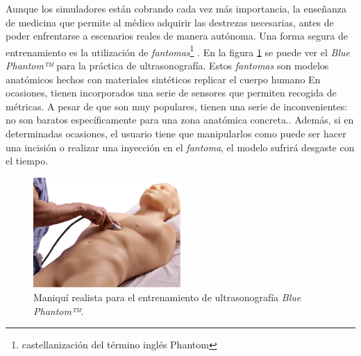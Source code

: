 Aunque los simuladores están cobrando cada vez más importancia, la enseñanza de medicina  que permite al médico adquirir las destrezas necesarias, antes de poder enfrentarse a escenarios reales de manera autónoma. Una forma segura de entrenamiento es la utilización de \emph{fantomas}\footnote{castellanización del término inglés Phantom} \cite{phantomra}. En la figura \ref{fig:phantom} se puede ver el \emph{Blue Phantom™}\cite{BluePH} para la práctica de ultrasonografía. Estos \emph{fantomas} son modelos anatómicos hechos con materiales sintéticos  replicar el cuerpo humano  En ocasiones, tienen incorporados una serie de sensores que permiten recogida de métricas. A pesar de que son muy populares, tienen una serie de inconvenientes: no son baratos  específicamente para una zona anatómica concreta.. Además, si en determinadas ocasiones, el usuario tiene que manipularlos como puede ser hacer una incisión o realizar una inyección en el \emph{fantoma}, el modelo sufrirá desgaste con el tiempo.
\begin{figure}[h]
   \centering
    \includegraphics[width=0.5\textwidth]{IMG/fast_trauma.jpg}
    \caption{Maniquí realista para el entrenamiento de ultrasonografía  \emph{Blue Phantom™}\cite{BluePH}. }
   \label{fig:phantom}
\end{figure}

